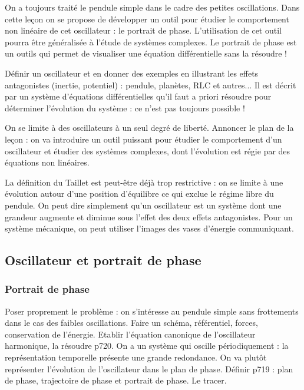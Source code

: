 On a toujours traité le pendule simple dans le cadre des petites oscillations.
Dans cette leçon on se propose de développer un outil pour étudier le comportement non linéaire de cet oscillateur : le portrait de phase.
L'utilisation de cet outil pourra être généralisée à l'étude de systèmes complexes.
Le portrait de phase est un outils qui permet de visualiser une équation différentielle sans la résoudre !

Définir un oscillateur \cite{Taillet2018} et en donner des exemples en illustrant les effets antagonistes (inertie, potentiel) : pendule, planètes, RLC et autres...
Il est décrit par un système d'équations différentielles qu'il faut a priori résoudre pour déterminer l'évolution du système : ce n'est pas toujours possible !

On se limite à des oscillateurs à un seul degré de liberté.
Annoncer le plan de la leçon : on va introduire un outil puissant pour étudier le comportement d'un oscillateur et étudier des systèmes complexes, dont l'évolution est régie par des équations non linéaires.

\begin{remarque}
La définition du Taillet est peut-être déjà trop restrictive : on se limite à une évolution autour d'une position d'équilibre ce qui exclue le régime libre du pendule.
On peut dire simplement qu'un oscillateur est un système dont une grandeur augmente et diminue sous l'effet des deux effets antagonistes.
Pour un système mécanique, on peut utiliser l'images des vases d'énergie communiquant.
\end{remarque}

\subsection{Oscillateur et portrait de phase}

\subsubsection{Portrait de phase}

Poser proprement le problème : on s'intéresse au pendule simple sans frottements dans le cas des faibles oscillations.
Faire un schéma, référentiel, forces, conservation de l'énergie.
Etablir l'équation canonique de l'oscillateur harmonique, la résoudre \cite{Gie1992} p720.
On a un système qui oscille périodiquement : la représentation temporelle présente une grande redondance.
On va plutôt représenter l'évolution de l'oscillateur dans le plan de phase.
Définir \cite{Gie1992} p719 : plan de phase, trajectoire de phase et portrait de phase.
Le tracer.

